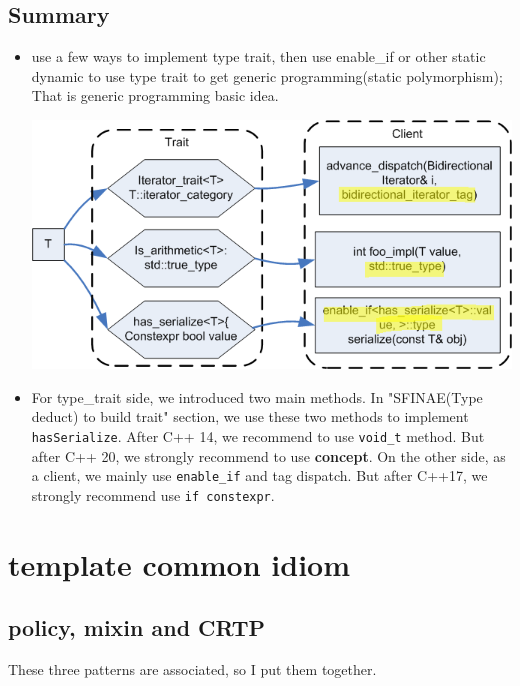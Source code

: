 \documentclass[a4paper,11pt,twoside]{book}
\begin{document}
\subsection{Summary}
\begin{itemize}
	\item use a few ways to implement type trait, then use enable\_if or other static dynamic to use type trait to get generic programming(static polymorphism); That is generic programming basic idea.
	
\begin{center}
	\includegraphics[scale=0.9]{pics/tag_dispatch.png}
\end{center}

	\item For type\_trait side, we introduced two main methods. In "SFINAE(Type deduct) to build trait" section, we use these two methods to implement \texttt{hasSerialize}. After C++ 14, we recommend to use \texttt{void\_t} method. But after C++ 20, we strongly recommend to use \textbf{concept}. On the other side, as a client, we mainly use \texttt{enable\_if} and tag dispatch. But after C++17, we strongly recommend use \texttt{if constexpr}.
	
\end{itemize}


\section{template common idiom}

\subsection{policy, mixin and CRTP}
These three patterns are associated, so I put them together. 
\end{document}
